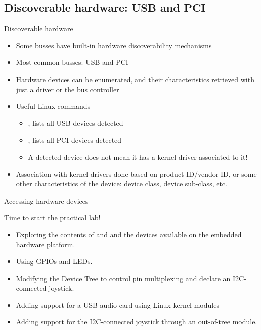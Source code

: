 \subsection{Discoverable hardware: USB and PCI}

\begin{frame}{Discoverable hardware}
  \begin{itemize}
  \item Some busses have built-in hardware discoverability mechanisms
  \item Most common busses: USB and PCI
  \item Hardware devices can be enumerated, and their characteristics
    retrieved with just a driver or the bus controller
  \item Useful Linux commands
    \begin{itemize}
    \item {}, lists all USB devices detected
    \item {}, lists all PCI devices detected
    \item A detected device does not mean it has a kernel driver
      associated to it!
    \end{itemize}
  \item Association with kernel drivers done based on product
    ID/vendor ID, or some other characteristics of the device: device
    class, device sub-class, etc.
  \end{itemize}
\end{frame}


\setuplabframe
{Accessing hardware devices}
{
  Time to start the practical lab!
  \begin{itemize}
  \item Exploring the contents of  and  and the
    devices available on the embedded hardware platform.
  \item Using GPIOs and LEDs.
  \item Modifying the Device Tree to control pin multiplexing and
        declare an I2C-connected joystick.
  \item Adding support for a USB audio card using Linux kernel modules
  \item Adding support for the I2C-connected joystick through
        an out-of-tree module.
  \end{itemize}
}

